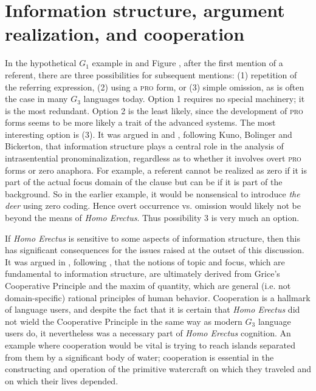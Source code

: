 \documentclass[output=paper,colorlinks,citecolor=brown]{langscibook}
\begin{document}
\section{Information structure, argument realization, and cooperation}\label{sec:vanvalin:4}

In the hypothetical $G_1$ example in  and Figure , after the first mention of a referent, there are three possibilities for subsequent mentions: (1) repetition of the referring expression, (2) using a \textsc{pro} form, or  (3) simple omission, as is often the case in many $G_3$ languages today.  Option 1 requires no special machinery; it is the most redundant.  Option 2 is the least likely, since the development of \textsc{pro} forms seems to be more likely a trait of the advanced systems.  The most interesting option is (3).  It was argued in \citet{van1990functionalism} and \citet{van1997syntax}, following Kuno, Bolinger and Bickerton, that information structure plays a central role in the analysis of intrasentential pronominalization, regardless as to whether it involves overt \textsc{pro} forms or zero anaphora.  For example, a referent cannot be realized as zero if it is part of the actual focus 
domain of the clause but can be if it is part of the background.  So in the earlier example, it would be nonsensical to introduce \emph{the deer} using zero coding.  Hence overt occurrence vs. omission would likely not be beyond the means of \emph{Homo Erectus}.  Thus possibility 3 is very much an option.

If \emph{Homo Erectus} is sensitive to some aspects of information structure, then this has significant consequences for the issues raised at the outset of this discussion.  It was argued in \citet{van1993synopsis}, following \citet{kempson1975presupposition}, that the notions of topic and focus, which are fundamental to information structure, are ultimately derived from Grice’s Cooperative Principle and the maxim of quantity, which are general (i.e. not domain-specific) rational principles of human behavior.  Cooperation is a hallmark of language users, and despite the fact that it is certain that \emph{Homo Erectus} did not wield the Cooperative Principle in the same way as modern $G_3$ language users do, it nevertheless was a necessary part of \emph{Homo Erectus} cognition.  An example where cooperation would be vital is trying to reach islands separated from them by a significant body of water; cooperation is essential in the constructing and operation of the primitive watercraft on which they traveled and on which their lives depended.
\end{document}
